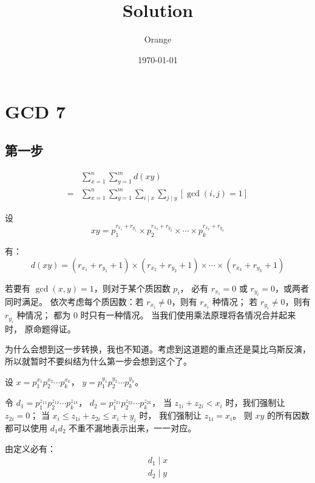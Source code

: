 \documentclass[UTF8]{article}
\title{Solution}
\author{Orange}
\date{\today}
\begin{document}
	\heiti

	\section{GCD 7}

	\subsection{第一步}

	\begin{align*}&
		\sum_{x = 1}^{n} \sum_{y = 1}^{m} d(xy)
		\\=&
		\sum_{x = 1}^{n} \sum_{y = 1}^{m}
		\sum_{i \mid x} \sum_{j \mid y} [\gcd(i, j) = 1]
	\end{align*}


	设
	$$
	xy =
	p_{1}^{r_{x_1} + r_{y_1}} \times
	p_{2}^{r_{x_2} + r_{y_2}} \times
	\cdots \times
	p_{k}^{r_{x_k} + r_{y_k}}
	$$

	有：
	$$
	d(xy) =
	(r_{x_1} + r_{y_1} + 1) \times
	(r_{x_2} + r_{y_2} + 1) \times
	\cdots \times
	(r_{x_k} + r_{y_k} + 1)
	$$

	若要有 $\gcd(x, y) = 1$，则对于某个质因数 $p_i$，
	必有 $r_{x_i} = 0$ 或 $r_{y_i} = 0$，或两者同时满足。
	依次考虑每个质因数：若 $r_{x_i} \ne 0$，则有 $r_{x_i}$ 种情况；
	若 $r_{y_i} \ne 0$，则有 $r_{y_i}$ 种情况；
	都为 $0$ 时只有一种情况。
	当我们使用乘法原理将各情况合并起来时，
	原命题得证。

	\bigskip
	为什么会想到这一步转换，我也不知道。考虑到这道题的重点还是莫比乌斯反演，
	所以就暂时不要纠结为什么第一步会想到这个了。

	\bigskip\bigskip\bigskip

	设 $x = p_1^{x_1} p_2^{x_2} \cdots p_k^{x_k}$，
	$y = p_1^{y_1} p_2^{y_2} \cdots p_k^{y_k}$。

	令 $d_1 = p_1^{z_{11}} p_2^{z_{12}} \cdots p_k^{z_{1k}}$，
	$d_2 = p_1^{z_{21}} p_2^{z_{22}} \cdots p_k^{z_{2k}}$，
	当 $z_{1i} + z_{2i} < x_i$ 时，我们强制让 $z_{2i} = 0$；
	当 $x_i \le z_{1i} + z_{2i} \le x_i + y_i$ 时，
	我们强制让 $z_{1i} = x_i$。
	则 $xy$ 的所有因数都可以使用 $d_1 d_2$ 不重不漏地表示出来，一一对应。
	
	\bigskip
	由定义必有：
	\begin{gather*}
		d_1 \mid x
		\\
		d_2 \mid y
	\end{gather*}
	
\end{document}
